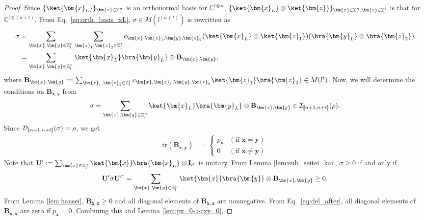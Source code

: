 \documentclass[reprint,amsmath,amssymb,aps,]{revtex4-2}
\theoremstyle{definition}
\newcommand{\SET}[1]{\mathbb{#1}}
\newcommand{\Z}{\SET{Z}}
\newcommand{\C}{\SET{C}}
\newcommand{\1}{\mbox{1}\hspace{-0.25em}\mbox{l}}%
\newcommand{\setint}[1]{[\hspace{-0.5mm}[#1]\hspace{-0.5mm}]}
\newcommand{\mat}[1]{\mathbf{#1}}
\newcommand{\pure}[2]{\C^{#1 \otimes #2}}
\newcommand{\QU}[1]{\mathcal{#1}}
\begin{document}
\begin{proof}
  Since $\{ \ket{\bm{x}_L} \}_{ \bm{x} \in \Z_{l}^{n} }$ is   
  an orthonormal basis for $\pure{l}{n}$,
  $\{ \ket{\bm{x}_L} \otimes \ket{ \bm{z} } \}_{\bm{x} \in \Z_{l}^{n}, \bm{z} \in \Z_l^t}$
  is
  that for $\pure{l}{(n+t)}$.
  From Eq.~\eqref{eq:orth_basis_xL},
  $\sigma \in M(l^{(n+t)})$ is rewritten as
  \begin{align*}
    \sigma
    &=
    \sum_{\bm{x},\bm{y} \in \Z_{l}^{n}}
    \sum_{\bm{z}_1,\bm{z}_2 \in \Z_l^t}
    c_{\bm{x},\bm{z}_1,\bm{y},\bm{z}_2}
    (\ket{\bm{x}_L} \otimes \ket{ \bm{z}_1 })
    (\bra{\bm{y}_L} \otimes \bra{ \bm{z}_2 })\\
    &=
    \sum_{\bm{x},\bm{y} \in \Z_{l}^{n}}
    \ket{\bm{x}_L}\bra{\bm{y}_L} \otimes
    \mat{B}_{\bm{x},\bm{y}},
  \end{align*}
  where
  $\mat{B}_{\bm{x},\bm{y}} := \sum_{\bm{z}_1,\bm{z}_2 \in \Z_l^t} c_{\bm{x},\bm{z}_1,\bm{y},\bm{z}_2} \ket{ \bm{z}_1 }\bra{ \bm{z}_2 } \in M(l^t)$.
  Now,
  we will determine the conditions on $\mat{B}_{\bm{x},\bm{y}}$ from
  \begin{align*}
    \sigma
    =
    \sum_{\bm{x},\bm{y} \in \Z_{l}^{n}}
    \ket{\bm{x}_L}\bra{\bm{y}_L} \otimes \mat{B}_{\bm{x},\bm{y}}
    \in
    \QU{I}_{\setint{n+1,n+t}}(\rho).
  \end{align*}
  Since $\QU{D}_{\setint{n+1,n+t}}(\sigma) = \rho$,
  we get
  \begin{align}
    \text{tr} ( \mat{B}_{\bm{x},\bm{y}} )
    &=
    \begin{cases}
      p_{ \bm{x} } &( \text{if~} \bm{x} = \bm{y} )\\
      0 &( \text{if~} \bm{x} \neq \bm{y} )
    \end{cases}
    \label{eq:del_after}
  \end{align}
  Note that
  $\mat{U}' := \sum_{ \bm{x} \in \Z_l^n } \ket{\bm{x}} \bra{\bm{x}_L} \otimes \mat{I}_{l^t}$
  is unitary.
  From Lemma \ref{lem:sub_seitei_kai},
  $\sigma \ge 0$
  if and only if
  \begin{align*}
    \mat{U}' \sigma \mat{U}'^\dagger 
    =
    \sum_{\bm{x},\bm{y} \in \Z_{l}^{n}}
    \ket{\bm{x}}\bra{\bm{y}} \otimes
    \mat{B}_{\bm{x},\bm{y}}
    \ge 0.
  \end{align*}
  From Lemma \ref{lem:hansei},
  $\mat{B}_{\bm{x},\bm{x}} \ge 0$ and
  all diagonal elements of $\mat{B}_{\bm{x},\bm{x}}$ are nonnegative.
  From Eq.~\eqref{eq:del_after},
  all diagonal elements of $\mat{B}_{\bm{x},\bm{x}}$ are zero
  if $p_{\bm{x}} = 0$.
  Combining this and Lemma \ref{lem:px=0->cxy=0},

\end{proof}
\end{document}
